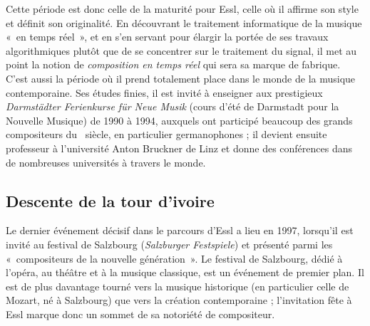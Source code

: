 \documentclass[a4paper,12pt]{article}
\newcommand{\guill}[1]{«~#1~»}
\newcommand{\zitat}[2]{\#Citation(#2)\#}
\begin{document}



Cette période est donc celle de la maturité pour Essl, celle où il affirme son style et définit son originalité. En découvrant le traitement informatique de la musique \guill{en temps réel}, et en s'en servant pour élargir la portée de ses travaux algorithmiques plutôt que de se concentrer sur le traitement du signal, il met au point la notion de \emph{composition en temps réel} qui sera sa marque de fabrique. C'est aussi la période où il prend totalement place dans le monde de la musique contemporaine. Ses études finies, il est invité à enseigner aux prestigieux \emph{Darmstädter Ferienkurse für Neue Musik} (cours d'été de Darmstadt pour la Nouvelle Musique) de 1990 à 1994, auxquels ont participé beaucoup des grands compositeurs du \XXe~siècle, en particulier germanophones ; il devient ensuite professeur à l'université Anton Bruckner de Linz et donne des conférences dans de nombreuses universités à travers le monde.


\subsection{Descente de la tour d'ivoire}
\label{liberte}

Le dernier événement décisif dans le parcours d'Essl a lieu en 1997, lorsqu'il est invité au festival de Salzbourg (\emph{Salzburger Festspiele}) et présenté parmi les \guill{compositeurs de la nouvelle génération}. Le festival de Salzbourg, dédié à l'opéra, au théâtre et à la musique classique, est un événement de premier plan. Il est de plus davantage tourné vers la musique historique (en particulier celle de Mozart, né à Salzbourg) que vers la création contemporaine ; l'invitation fête à Essl marque donc un sommet de sa notoriété de compositeur.
\end{document}
